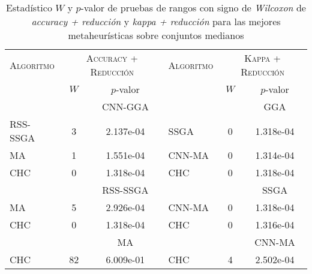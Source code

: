 \begin{table}[]
\centering
\begin{adjustbox}{max width =\textwidth}
\begin{tabular}{l c c|l c c}
\hline
	  \textsc{Algoritmo}
	& \multicolumn{2}{c}{\textsc{Accuracy + Reducción}}
	& \multicolumn{1}{|c}{\textsc{Algoritmo}}
	& \multicolumn{2}{c}{\textsc{Kappa +  Reducción}} \\
 & $W$ & $p$-valor & & $W$ & $p$-valor \\
\hline
\hline

 & & CNN-GGA & & & GGA \\

RSS-SSGA & 3 & 2.137e-04 & SSGA & 0 & 1.318e-04 \\
MA & 1 & 1.551e-04 & CNN-MA & 0 & 1.314e-04 \\
CHC & 0 & 1.318e-04 & CHC & 0 & 1.318e-04 \\

\hline
 
 & & RSS-SSGA & & & SSGA \\

MA & 5 & 2.926e-04 & CNN-MA & 0 & 1.318e-04 \\
CHC & 0 & 1.318e-04 & CHC & 0 & 1.316e-04 \\

\hline

 & & MA & & & CNN-MA \\

CHC & 82 & 6.009e-01 & CHC & 4 & 2.502e-04 \\

\hline

\end{tabular}
\end{adjustbox}
\caption[Pruebas de \emph{Wilcoxon} entre las mejores metaheurísticas para los conjuntos medianos sobre \emph{accuracy + reducción} y \emph{kappa + reducción}]{Estadístico $W$ y $p$-valor de pruebas de rangos con signo de \emph{Wilcoxon} de \emph{accuracy + reducción} y \emph{kappa + reducción} para las mejores metaheurísticas sobre conjuntos medianos}
\label{wilcox2-all-med}
\end{table}